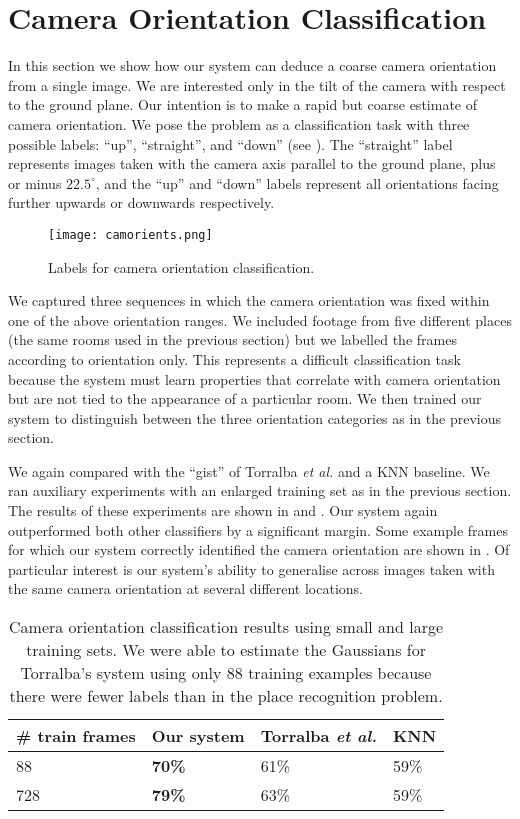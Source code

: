 \section{Camera Orientation Classification}
In this section we show how our system can deduce a coarse camera
orientation from a single image. We are interested only in the tilt of
the camera with respect to the ground plane. Our intention is to make
a rapid but coarse estimate of camera orientation. We pose the problem
as a classification task with three possible labels: ``up'',
``straight'', and ``down'' (see ). The ``straight''
label represents images taken with the camera axis parallel to the
ground plane, plus or minus $22.5^{\circ}$, and the ``up'' and
``down'' labels represent all orientations facing further upwards or
downwards respectively.

\begin{figure}[htp]
\centering
\texttt{[image: camorients.png]}
\caption{Labels for camera orientation classification.}
\label{fig:camorients}
\end{figure}

We captured three sequences in which the camera orientation was fixed
within one of the above orientation ranges. We included footage from
five different places (the same rooms used in the previous section) but
we labelled the frames according to orientation only. This represents
a difficult classification task because the system must learn
properties that correlate with camera orientation but are not tied to
the appearance of a particular room. We then trained our system to
distinguish between the three orientation categories as in the
previous section.

We again compared with the ``gist'' of Torralba {\em et al.} and a KNN
baseline. We ran auxiliary experiments with an enlarged training set
as in the previous section. The results of these experiments are shown
in  and . Our
system again outperformed both other classifiers by a significant
margin. Some example frames for which our system correctly identified
the camera orientation are shown in . Of particular
interest is our system's ability to generalise across images taken
with the same camera orientation at several different locations.

\begin{table}[htb]
\centering
\begin{tabular}{ l || l | l | l }
\# train frames & Our system & Torralba {\em et al.} & KNN \\
\hline			
88 & \textbf{70\%} & 61\% & 59\% \\
728 & \textbf{79\%} & 63\% & 59\% \\
\end{tabular}
\caption{Camera orientation classification results using small and
  large training sets. We were able to estimate the Gaussians for
  Torralba's system using only 88 training examples because there were
  fewer labels than in the place recognition problem.}
\label{table:orient-cla-results}
\end{table}

